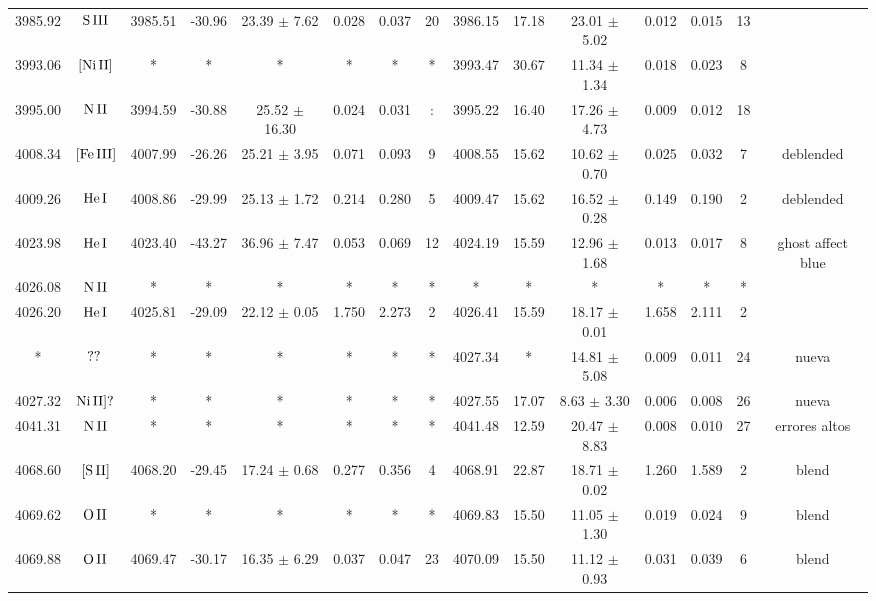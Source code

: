 \documentclass{article}
\begin{document}
\begin{table*}
\begin{adjustbox}{width=\textwidth}
\begin{tabular}{ccccccccccccccc}
3985.92 & $\mbox{S}\thinspace \mbox{III}$ & 3985.51 & -30.96 & 23.39 $\pm$ 7.62 & 0.028 & 0.037 & 20 & 3986.15 & 17.18 & 23.01 $\pm$ 5.02 & 0.012 & 0.015 & 13 &  \\
3993.06 & $\mbox{[Ni}\thinspace \mbox{II]}$ & * & * & * & * & * & * & 3993.47 & 30.67 & 11.34 $\pm$ 1.34 & 0.018 & 0.023 & 8 &  \\
3995.00 & $\mbox{N}\thinspace \mbox{II}$ & 3994.59 & -30.88 & 25.52 $\pm$ 16.30 & 0.024 & 0.031 & : & 3995.22 & 16.40 & 17.26 $\pm$ 4.73 & 0.009 & 0.012 & 18 &  \\
4008.34 & $\mbox{[Fe}\thinspace \mbox{III]}$ & 4007.99 & -26.26 & 25.21 $\pm$ 3.95 & 0.071 & 0.093 & 9 & 4008.55 & 15.62 & 10.62 $\pm$ 0.70 & 0.025 & 0.032 & 7 &  deblended \\
4009.26 & $\mbox{He}\thinspace \mbox{I}$ & 4008.86 & -29.99 & 25.13 $\pm$ 1.72 & 0.214 & 0.280 & 5 & 4009.47 & 15.62 & 16.52 $\pm$ 0.28 & 0.149 & 0.190 & 2 &  deblended \\
4023.98 & $\mbox{He}\thinspace \mbox{I}$ & 4023.40 & -43.27 & 36.96 $\pm$ 7.47 & 0.053 & 0.069 & 12 & 4024.19 & 15.59 & 12.96 $\pm$ 1.68 & 0.013 & 0.017 & 8 &  ghost affect blue \\
4026.08 & $\mbox{N}\thinspace \mbox{II}$ & * & * & * & * & * & * & * & * & * & * & * & * &  \\
4026.20 & $\mbox{He}\thinspace \mbox{I}$ & 4025.81 & -29.09 & 22.12 $\pm$ 0.05 & 1.750 & 2.273 & 2 & 4026.41 & 15.59 & 18.17 $\pm$ 0.01 & 1.658 & 2.111 & 2 &  \\
* & $\mbox{??}\thinspace \mbox{}$ & * & * & * & * & * & * & 4027.34 & * & 14.81 $\pm$ 5.08 & 0.009 & 0.011 & 24 &  nueva \\
4027.32 & $\mbox{Ni}\thinspace \mbox{II]?}$ & * & * & * & * & * & * & 4027.55 & 17.07 & 8.63 $\pm$ 3.30 & 0.006 & 0.008 & 26 &  nueva \\
4041.31 & $\mbox{N}\thinspace \mbox{II}$ & * & * & * & * & * & * & 4041.48 & 12.59 & 20.47 $\pm$ 8.83 & 0.008 & 0.010 & 27 &  errores altos \\
4068.60 & $\mbox{[S}\thinspace \mbox{II]}$ & 4068.20 & -29.45 & 17.24 $\pm$ 0.68 & 0.277 & 0.356 & 4 & 4068.91 & 22.87 & 18.71 $\pm$ 0.02 & 1.260 & 1.589 & 2 &  blend \\
4069.62 & $\mbox{O}\thinspace \mbox{II}$ & * & * & * & * & * & * & 4069.83 & 15.50 & 11.05 $\pm$ 1.30 & 0.019 & 0.024 & 9 &  blend \\
4069.88 & $\mbox{O}\thinspace \mbox{II}$ & 4069.47 & -30.17 & 16.35 $\pm$ 6.29 & 0.037 & 0.047 & 23 & 4070.09 & 15.50 & 11.12 $\pm$ 0.93 & 0.031 & 0.039 & 6 &  blend \\

\end{tabular}
\end{adjustbox}
\end{table*}
\end{document}
